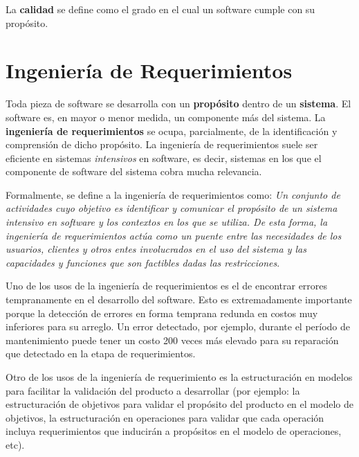 \documentclass[]{article}
\begin{document}
La \textbf{calidad} se define como el grado en el cual un software cumple con su propósito.

\newpage

\section{Ingeniería de Requerimientos}
Toda pieza de software se desarrolla con un \textbf{propósito} dentro de un \textbf{sistema}. El software es, en mayor o menor medida, un componente más del sistema. La \textbf{ingeniería de requerimientos} se ocupa, parcialmente, de la identificación y comprensión de dicho propósito. La ingeniería de requerimientos suele ser eficiente en sistemas \textit{intensivos} en software, es decir, sistemas en los que el componente de software del sistema cobra mucha relevancia.

Formalmente, se define a la ingeniería de requerimientos como: \textit{Un conjunto de actividades cuyo objetivo es identificar y comunicar el propósito de un sistema intensivo en software y los contextos en los que se utiliza. De esta forma, la ingeniería de requerimientos actúa como un puente entre las necesidades de los usuarios, clientes y otros entes involucrados en el uso del sistema y las capacidades y funciones que son factibles dadas las restricciones}.

Uno de los usos de la ingeniería de requerimientos es el de encontrar errores tempranamente en el desarrollo del software. Esto es extremadamente importante porque la detección de errores en forma temprana redunda en costos muy inferiores para su arreglo. Un error detectado, por ejemplo, durante el período de mantenimiento puede tener un costo 200 veces más elevado para su reparación que detectado en la etapa de requerimientos.

Otro de los usos de la ingeniería de requerimiento es la estructuración en modelos para facilitar la validación del producto a desarrollar (por ejemplo: la estructuración de objetivos para validar el propósito del producto en el modelo de objetivos, la estructuración en operaciones para validar que cada operación incluya requerimientos que inducirán a propósitos en el modelo de operaciones, etc).
\end{document}
